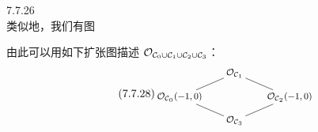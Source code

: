 \begin{exam}{7.7.26}
\begin{equation}
\end{equation}
类似地，我们有图
\begin{center}
\end{center}
由此可以用如下扩张图描述 $\mathcal{O}_{\mathcal{C}_0\cup\mathcal{C}_1\cup\mathcal{C}_2\cup\mathcal{C}_3}$：
\begin{equation}\tag{7.7.28}\label{eq:a4-7-7-28}
\begin{tikzpicture}[baseline=(current bounding box.center),every node/.style={font=\footnotesize, inner sep=2pt}]
\node (t) at (0,1.5) {$\OO_{\CC_1}$};
\node (l) at (-1.75,0.75) {$\OO_{\CC_0}(-1,0)$};
\node (r) at (1.75,0.75) {$\OO_{\CC_2}(-1,0)$};
\node (b) at (0,0) {$\OO_{\CC_3}$};
\draw (t)--(l); \draw (t)--(r); \draw (l)--(b); \draw (r)--(b);
\end{tikzpicture}
\end{equation}
\end{exam}

